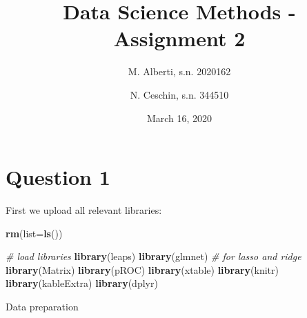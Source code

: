 \documentclass[
]{article}
\title{Data Science Methods - Assignment 2}
\author{M. Alberti, s.n. 2020162 \and N. Ceschin, s.n. 344510}
\date{March 16, 2020}
\newenvironment{Shaded}{\begin{snugshade}}{\end{snugshade}}
\newcommand{\CommentTok}[1]{\textcolor[rgb]{0.56,0.35,0.01}{\textit{#1}}}
\newcommand{\DataTypeTok}[1]{\textcolor[rgb]{0.13,0.29,0.53}{#1}}
\newcommand{\KeywordTok}[1]{\textcolor[rgb]{0.13,0.29,0.53}{\textbf{#1}}}
\newcommand{\NormalTok}[1]{#1}
\begin{document}
\maketitle

\hypertarget{question-1}{%
\section{Question 1}\label{question-1}}

First we upload all relevant libraries:

\begin{Shaded}
\begin{Highlighting}[]
\KeywordTok{rm}\NormalTok{(}\DataTypeTok{list=}\KeywordTok{ls}\NormalTok{())}

\CommentTok{# load libraries}
\KeywordTok{library}\NormalTok{(leaps)}
\KeywordTok{library}\NormalTok{(glmnet) }\CommentTok{# for lasso and ridge}
\KeywordTok{library}\NormalTok{(Matrix)}
\KeywordTok{library}\NormalTok{(pROC)}
\KeywordTok{library}\NormalTok{(xtable)}
\KeywordTok{library}\NormalTok{(knitr)}
\KeywordTok{library}\NormalTok{(kableExtra)}
\KeywordTok{library}\NormalTok{(dplyr)}
\end{Highlighting}
\end{Shaded}

Data preparation
\end{document}
